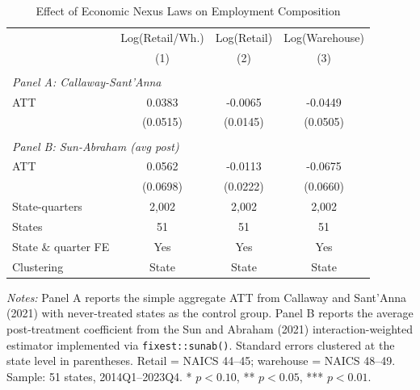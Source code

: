 \begin{table}[t]
\centering
\caption{Effect of Economic Nexus Laws on Employment Composition}
\label{tab:main}
\begin{tabular}{lccc}
\hline\hline
& Log(Retail/Wh.) & Log(Retail) & Log(Warehouse) \\
& (1) & (2) & (3) \\
\hline
\\[-1.8ex]
\multicolumn{4}{l}{\textit{Panel A: Callaway-Sant'Anna}} \\[0.5ex]
ATT & 0.0383 & -0.0065 & -0.0449 \\
& (0.0515) & (0.0145) & (0.0505) \\
\\[-1.8ex]
\multicolumn{4}{l}{\textit{Panel B: Sun-Abraham (avg post)}} \\[0.5ex]
ATT & 0.0562 & -0.0113 & -0.0675 \\
& (0.0698) & (0.0222) & (0.0660) \\
\hline
State-quarters & 2,002 & 2,002 & 2,002 \\
States & 51 & 51 & 51 \\
State \& quarter FE & Yes & Yes & Yes \\
Clustering & State & State & State \\
\hline\hline
\end{tabular}
\begin{tablenotes}
\small
\item \textit{Notes:} Panel A reports the simple aggregate ATT from Callaway and Sant'Anna (2021) with never-treated states as the control group. Panel B reports the average post-treatment coefficient from the Sun and Abraham (2021) interaction-weighted estimator implemented via \texttt{fixest::sunab()}. Standard errors clustered at the state level in parentheses. Retail = NAICS 44--45; warehouse = NAICS 48--49. Sample: 51 states, 2014Q1--2023Q4. * $p<0.10$, ** $p<0.05$, *** $p<0.01$.
\end{tablenotes}
\end{table}
